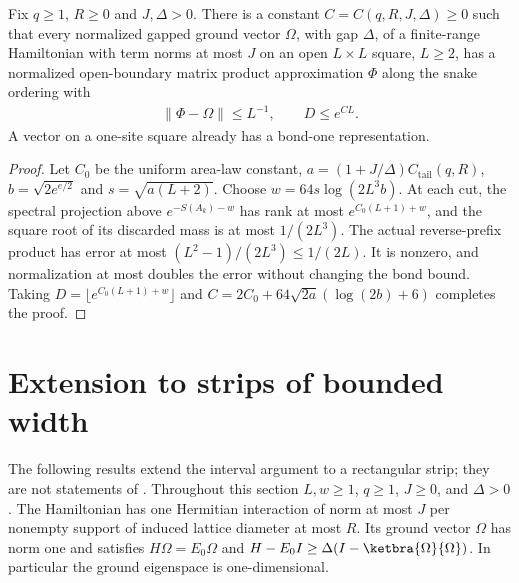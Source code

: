 \begin{corollary}
    \label{cor:snake_grid_mps}
    \leanok
    Fix $q\ge1$, $R\ge0$ and $J,\Delta>0$. There is a constant
    $C=C(q,R,J,\Delta)\ge0$ such that every normalized gapped ground
    vector $\Omega$, with gap $\Delta$, of a finite-range Hamiltonian
    with term norms at most $J$ on an open $L\times L$ square, $L\ge2$,
    has a normalized open-boundary matrix product approximation $\Phi$
    along the snake ordering with
    \begin{align}
        \|\Phi-\Omega\|\le L^{-1},\qquad D\le e^{CL}.
    \end{align}
    A vector on a one-site square already has a bond-one representation.
\end{corollary}
\begin{proof}
    \leanok
    Let $C_0$ be the uniform area-law constant,
    $a=(1+J/\Delta)C_{\mathrm{tail}}(q,R)$, $b=\sqrt{2e^{e/2}}$ and
    $s=\sqrt{a(L+2)}$. Choose
    $w=64s\log(2L^3b)$. At each cut, the spectral projection above
    $e^{-S(A_k)-w}$ has rank at most $e^{C_0(L+1)+w}$, and the square
    root of its discarded mass is at most $1/(2L^3)$. The actual
    reverse-prefix product has error at most
    $(L^2-1)/(2L^3)\le1/(2L)$. It is nonzero, and normalization at
    most doubles the error without changing the bond bound. Taking
    $D=\lfloor e^{C_0(L+1)+w}\rfloor$ and
    $C=2C_0+64\sqrt{2a}(\log(2b)+6)$ completes the proof.
\end{proof}

\section{Extension to strips of bounded width}

The following results extend the interval argument to a rectangular strip;
they are not statements of \cite{TNLean2026OneDimensional}.
Throughout this section $L,w\ge1$, $q\ge1$, $J\ge0$, and $\Delta>0$.
The Hamiltonian has one Hermitian interaction of norm at most $J$ per
nonempty support of induced lattice diameter at most $R$. Its ground vector
$\Omega$ has norm one and satisfies
$H\Omega=E_0\Omega$ and
$H-E_0I\ge\Delta(I-\ketbra{\Omega}{\Omega})$.
In particular the ground eigenspace is one-dimensional.

